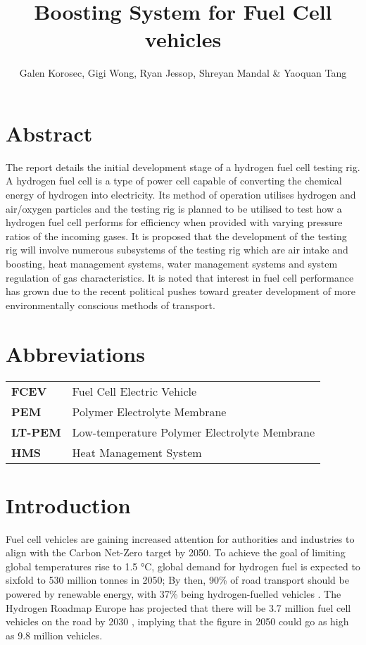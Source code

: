 \documentclass[a4paper,11pt]{article}
\title{Boosting System for Fuel Cell vehicles}
\author{Galen Korosec, Gigi Wong, Ryan Jessop, Shreyan Mandal \& Yaoquan Tang}
\begin{document}
\maketitle

\section*{Abstract}

The report details the initial development stage of a hydrogen fuel cell testing rig. A hydrogen fuel cell is a type of power cell capable of converting the chemical energy of hydrogen into electricity. Its method of operation utilises hydrogen and air/oxygen particles and the testing rig is planned to be utilised to test how a hydrogen fuel cell performs for efficiency when provided with varying pressure ratios of the incoming gases. It is proposed that the development of the testing rig will involve numerous subsystems of the testing rig which are air intake and boosting, heat management systems, water management systems and system regulation of gas characteristics. It is noted that interest in fuel cell performance has grown due to the recent political pushes toward greater development of more environmentally conscious methods of transport.

\tableofcontents

\section*{Abbreviations}

\begin{tabular}{ l l }
    \textbf{FCEV} & Fuel Cell Electric Vehicle \\
    \textbf{PEM} & Polymer Electrolyte Membrane \\
    \textbf{LT-PEM} & Low-temperature Polymer Electrolyte Membrane \\
    \textbf{HMS} & Heat Management System \\
\end{tabular}

\section{Introduction}

Fuel cell vehicles are gaining increased attention for authorities and industries to align with the Carbon Net-Zero target by 2050. To achieve the goal of limiting global temperatures rise to 1.5 °C, global demand for hydrogen fuel is expected to sixfold to 530 million tonnes in 2050; By then, 90\% of road transport should be powered by renewable energy, with 37\% being hydrogen-fuelled vehicles \cite{IEA2021netzero}. The Hydrogen Roadmap Europe has projected that there will be 3.7 million fuel cell vehicles on the road by 2030 \cite{FCHJU2019roadmap}, implying that the figure in 2050 could go as high as 9.8 million vehicles. 
\end{document}
